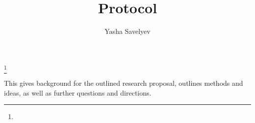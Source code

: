 \documentclass{amsart}
\numberwithin{equation}{section}
\theoremstyle{definition}
\theoremstyle{remark}
\DeclareMathOperator{\lcs}{l.c.s.}
\begin{document}
\title{Protocol}
\author{Yasha Savelyev}
\thanks {}
\address{University of Colima, CUICBAS}
\keywords{}
 \maketitle
%
This gives background for the outlined research proposal, outlines methods and ideas, as well as further questions and directions.
\end{document}
